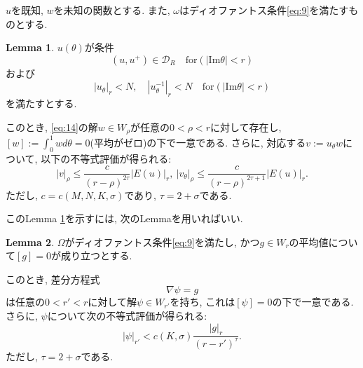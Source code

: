 \documentclass[a4paper]{ujarticle}
\numberwithin{equation}{section}
\theoremstyle{definition}
\newtheorem{lemma}{Lemma}
\begin{document}
        $u$を既知, $w$を未知の関数とする. また, $\omega$はディオファントス条件\eqref{eq:9}を満たすものとする.
        \begin{lemma} \label{lem:8}
            $u(\theta)$が条件
            \begin{equation} \label{eq:16}
                (u, u^{+}) \in \mathcal{D}_{R} \quad \text{for} (|\mathrm{Im} \theta| < r)
            \end{equation}
            および
            \begin{equation} \label{eq:17}
                |u_{\theta}|_r < N, \quad |u^{-1}_{\theta}|_r < N \quad \text{for} (|\mathrm{Im} \theta| < r)
            \end{equation}
            を満たすとする. 
            
            このとき, \eqref{eq:14}の解$w \in W_{\rho}$が任意の$0 < \rho < r$に対して存在し, $\displaystyle [w] := \int^{1}_{0} w d \theta = 0$(平均がゼロ)の下で一意である.
            さらに, 対応する$v := u_{\theta} w$について, 以下の不等式評価が得られる:
            \begin{equation} \label{eq:18}
                |v|_{\rho} \leq \frac{c}{(r - \rho)^{2 \tau}} |E(u)|_{r}, \ |v_{\theta}|_{\rho} \leq \frac{c}{(r - \rho)^{2 \tau + 1}} |E(u)|_{r}.
            \end{equation}
            ただし, $c = c(M ,N, K, \sigma)$であり, $\tau = 2 + \sigma$である.
        \end{lemma}

        このLemma \ref{lem:8}を示すには, 次のLemmaを用いればいい.
        \begin{lemma} \label{lem:9}
            $\Omega$がディオファントス条件\eqref{eq:9}を満たし, かつ$g \in W_r$の平均値について$[g] = 0$が成り立つとする.

            このとき, 差分方程式
            \begin{equation} \label{eq:19}
                \nabla \psi = g
            \end{equation}
            は任意の$0 < r' < r$に対して解$\psi \in W_{r'}$を持ち, これは$[\psi] = 0$の下で一意である.
            さらに, $\psi$について次の不等式評価が得られる:
            \begin{equation} \label{eq:20}
                |\psi|_{r'} < c(K, \sigma) \frac{|g|_{r}}{(r - r')^{\tau}}.
            \end{equation}
            ただし, $\tau = 2 + \sigma$である.
        \end{lemma}
\end{document}
